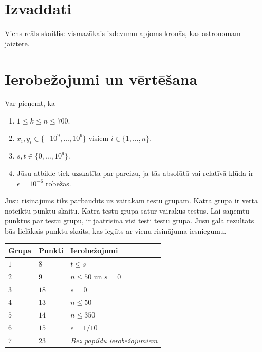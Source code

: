 \section*{Izvaddati}

Viens reāls skaitlis: vismazākais izdevumu apjoms kronās, kas astronomam jāiztērē.

\section*{Ierobežojumi un vērtēšana}

Var pieņemt, ka
\begin{enumerate}
\item $1\leq k\leq n\leq 700$. %
\item $x_i, y_i\in \{-10^9,\ldots, 10^9\}$ visiem $i\in\{1,\ldots,n\}$. %
\item $s,t\in \{0,\ldots, 10^9\}$. %
\item Jūsu atbilde tiek uzskatīta par pareizu, ja tās absolūtā vai relatīvā kļūda ir $\epsilon = 10^{-6}$ robežās.
\end{enumerate}

Jūsu risinājums tiks pārbaudīts uz vairākām testu grupām. Katra grupa ir vērta noteiktu punktu skaitu.
Katra testu grupa satur vairākus testus.
Lai saņemtu punktus par testu grupu, ir jāatrisina visi testi testu grupā.
Jūsu gala rezultāts būs lielākais punktu skaits, kas iegūts ar vienu risinājuma iesniegumu.

\medskip
\noindent
\begin{tabular}{lll}
  Grupa & Punkti & Ierobežojumi\\\hline
  $1$ & $8$ &  $t\leq s$\\
  $2$ & $9$ & $n\le 50$ un $s=0$\\
  $3$ & $18$ & $s=0$\\
  $4$ & $13$ & $n\leq 50$\\
  $5$ & $14$ & $n\leq 350$\\
  $6$ & $15$ & $\epsilon = 1/10$\\
  $7$ & $23$ & \emph{Bez papildu ierobežojumiem}\\
\end{tabular}
